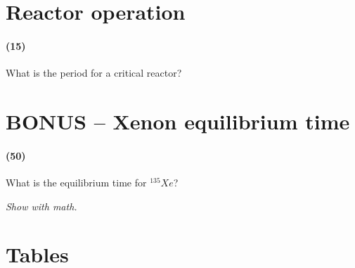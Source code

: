 \documentclass[11pt,a4paper]{article}
\makeatletter
\renewcommand\listoftables{%
    \@starttoc{lot}%
}
\makeatother
\begin{document}
\newpage

\section{Reactor operation}
\paragraph*{(15)}
What is the period for a critical reactor?





\newpage

\section{BONUS -- Xenon equilibrium time}
\paragraph*{(50)}
What is the equilibrium time for $^{135}Xe$? 

\vspace{\baselineskip}

\textit{Show with math.}





\newpage

\section*{Tables}

{%
\let\oldnumberline\numberline%
\renewcommand{\numberline}{\tablename~\oldnumberline}%
\listoftables%
}

\newpage

\end{document}
